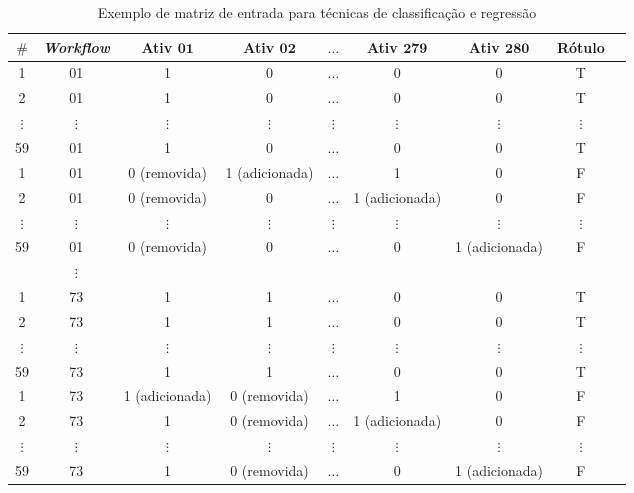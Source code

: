 \documentclass[10pt,letterpaper]{article}
\begin{document}
\begin{table}[!htb]
	\tiny
	\centering
	\caption{Exemplo de matriz de entrada para técnicas de classificação e regressão}
	\begin{tabular}{|c|c|c|c|c|c|c|c|c|}  \hline
		\textbf{\(\#\)} & \textbf{\emph{Workflow}} & \textbf{Ativ \(\mathbf{01}\)} & \textbf{Ativ \(\mathbf{02}\)} & \textbf{\(\mathbf{\ldots}\)}  & \textbf{Ativ \(\mathbf{279}\)} & \textbf{Ativ \(\mathbf{280}\)} & \textbf{Rótulo} \\ \hline
		
		1	&		01		 			   & 1 			  & 0 			  & \(\ldots\) 	  & 0 & 0  			& T	\\ \hline
		2	&		01 					   & 1 			  & 0 			  & \(\ldots\) 	  & 0 & 0  			& T	\\ \hline
		\(\vdots\)  &  \(\vdots\) 	   	   & \(\vdots\)   & \(\vdots\) 	  & \(\vdots\) 	  & \(\vdots\) & \(\vdots\) & \(\vdots\)\\ \hline
		59	&		01 					   & 1 			  & 0 			  & \(\ldots\) 	  & 0 & 0   		& T	\\ \hline
		1	&		01		 			   & 0 (removida) 		  & 1 (adicionada) &\(\ldots\)& 1 & 0	& F	\\ \hline
		2	&		01 					   & 0 (removida)& 0 		  & \(\ldots\) 	  & 1 (adicionada) & 0& F	\\ \hline
		\(\vdots\)  &		\(\vdots\) 	   & \(\vdots\) & \(\vdots\) 	  & \(\vdots\) 	  & \(\vdots\) & \(\vdots\) & \(\vdots\) \\ \hline
		59	&		01 					   & 0 (removida)			  & 0 			  & \(\ldots\) & 0 & 1 (adicionada)& F \\ \hline
		&\(\vdots\) & & & & & & 																		\\ \hline
		1	&		73		 			   & 1 			  & 1  & \(\ldots\) 	  & 0 & 0  			& T	\\ \hline
		2	&		73 					   & 1 			  & 1  & \(\ldots\) 	  & 0 & 0  			& T	\\ \hline
		\(\vdots\)  &		\(\vdots\) 	   & \(\vdots\)   & \(\vdots\) 	  & \(\vdots\) 	  & \(\vdots\) & \(\vdots\) & \(\vdots\) \\ \hline
		59	&		73 					   & 1 			  & 1  & \(\ldots\) 	  & 0 & 0   		& T	\\ \hline
		1	&		73		 			   & 1 (adicionada) & 0 (removida)  & \(\ldots\) 	  & 1 & 0   		& F	\\ \hline
		2	&		73 					   & 1 			  & 0 (removida)  & \(\ldots\)& 1 (adicionada) & 0  & F	\\ \hline
		\(\vdots\)  &		\(\vdots\) 	   & \(\vdots\)   & \(\vdots\) 	  & \(\vdots\) 	  & \(\vdots\) & \(\vdots\) & \(\vdots\)	\\ \hline
		59	&		73 					   & 1 			  & 0 (removida)  & \(\ldots\) 	  & 0 & 1 (adicionada) & F	\\ \hline
	\end{tabular}
	\label{tabela_matriz_de_dados_adapatada_classificacao_regressao}
	\vspace{0.1cm}
\end{table}
\end{document}
